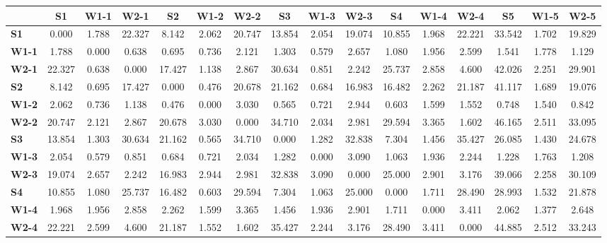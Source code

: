\begin{table*}[h!]
\begin{center}
\begin{tabular}{| l || c | c | c || c | c | c || c | c | c || c | c | c || c | c | c |}\hline
 & {\bf S1} & {\bf W1-1} & {\bf W2-1} & {\bf S2} & {\bf W1-2} & {\bf W2-2} & {\bf S3} & {\bf W1-3} & {\bf W2-3} & {\bf S4} & {\bf W1-4} & {\bf W2-4} & {\bf S5} & {\bf W1-5} & {\bf W2-5} \\\hline\hline
{\bf S1} & 0.000 & 1.788 & 22.327 & 8.142 & 2.062 & 20.747 & 13.854 & 2.054 & 19.074 & 10.855 & 1.968 & 22.221 & 33.542 & 1.702 & 19.829 \\\hline
{\bf W1-1} & 1.788 & 0.000 & 0.638 & 0.695 & 0.736 & 2.121 & 1.303 & 0.579 & 2.657 & 1.080 & 1.956 & 2.599 & 1.541 & 1.778 & 1.129 \\\hline
{\bf W2-1} & 22.327 & 0.638 & 0.000 & 17.427 & 1.138 & 2.867 & 30.634 & 0.851 & 2.242 & 25.737 & 2.858 & 4.600 & 42.026 & 2.251 & 29.901 \\\hline\hline
{\bf S2} & 8.142 & 0.695 & 17.427 & 0.000 & 0.476 & 20.678 & 21.162 & 0.684 & 16.983 & 16.482 & 2.262 & 21.187 & 41.117 & 1.689 & 19.076 \\\hline
{\bf W1-2} & 2.062 & 0.736 & 1.138 & 0.476 & 0.000 & 3.030 & 0.565 & 0.721 & 2.944 & 0.603 & 1.599 & 1.552 & 0.748 & 1.540 & 0.842 \\\hline
{\bf W2-2} & 20.747 & 2.121 & 2.867 & 20.678 & 3.030 & 0.000 & 34.710 & 2.034 & 2.981 & 29.594 & 3.365 & 1.602 & 46.165 & 2.511 & 33.095 \\\hline\hline
{\bf S3} & 13.854 & 1.303 & 30.634 & 21.162 & 0.565 & 34.710 & 0.000 & 1.282 & 32.838 & 7.304 & 1.456 & 35.427 & 26.085 & 1.430 & 24.678 \\\hline
{\bf W1-3} & 2.054 & 0.579 & 0.851 & 0.684 & 0.721 & 2.034 & 1.282 & 0.000 & 3.090 & 1.063 & 1.936 & 2.244 & 1.228 & 1.763 & 1.208 \\\hline
{\bf W2-3} & 19.074 & 2.657 & 2.242 & 16.983 & 2.944 & 2.981 & 32.838 & 3.090 & 0.000 & 25.000 & 2.901 & 3.176 & 39.066 & 2.258 & 30.109 \\\hline\hline
{\bf S4} & 10.855 & 1.080 & 25.737 & 16.482 & 0.603 & 29.594 & 7.304 & 1.063 & 25.000 & 0.000 & 1.711 & 28.490 & 28.993 & 1.532 & 21.878 \\\hline
{\bf W1-4} & 1.968 & 1.956 & 2.858 & 2.262 & 1.599 & 3.365 & 1.456 & 1.936 & 2.901 & 1.711 & 0.000 & 3.411 & 2.062 & 1.377 & 2.648 \\\hline
{\bf W2-4} & 22.221 & 2.599 & 4.600 & 21.187 & 1.552 & 1.602 & 35.427 & 2.244 & 3.176 & 28.490 & 3.411 & 0.000 & 44.885 & 2.512 & 33.243 \\\hline\hline

\end{tabular}
\end{center}
\end{table*}
